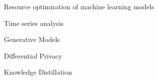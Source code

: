 

\begin{cventries}

\vspace{5mm}

  \begin{cvitems} %
    \item {Resource optimization of machine learning models}
    \item {Time series analysis}
    \item {Generative Models}
  	\item {Differential Privacy}
    \item {Knowledge Distillation}
   \end{cvitems}
    
\end{cventries}
